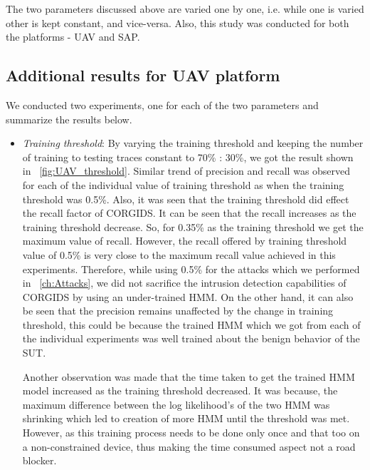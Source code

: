 The two parameters discussed above are varied one by one, i.e. while one is varied other is kept constant, and vice-versa. Also, this study was conducted for both the platforms - \ac{UAV} and \ac{SAP}.

\subsection{Additional results for UAV platform}
We conducted two experiments, one for each of the two parameters and summarize the results below.

\begin{itemize}

\item \textit{Training threshold}: By varying the training threshold and keeping the number of training to testing traces constant to 70\% : 30\%, we got the result shown in ~\autoref{fig:UAV_threshold}. Similar trend of precision and recall was observed for each of the individual value of training threshold as when the training threshold was 0.5\%. Also, it was seen that the training threshold did effect the recall factor of \ac{CORGIDS}. It can be seen that the recall increases as the training threshold decrease. So, for 0.35\% as the training threshold we get the maximum value of recall. However, the recall offered by training threshold value of 0.5\% is very close to the maximum recall value achieved in this experiments. Therefore, while using 0.5\% for the attacks which we performed in ~\autoref{ch:Attacks}, we did not sacrifice the intrusion detection capabilities of \ac{CORGIDS} by using an under-trained \ac{HMM}. On the other hand, it can also be seen that the precision remains unaffected by the change in training threshold, this could be because the trained \ac{HMM} which we got from each of the individual experiments was well trained about the benign behavior of the \ac{SUT}.

Another observation was made that the time taken to get the trained \ac{HMM} model increased as the training threshold decreased. It was because, the maximum difference between the log likelihood's of the two \ac{HMM} was shrinking which led to creation of more \ac{HMM} until the threshold was met. However, as this training process needs to be done only once and that too on a non-constrained device, thus making the time consumed aspect not a road blocker.


\end{itemize}
